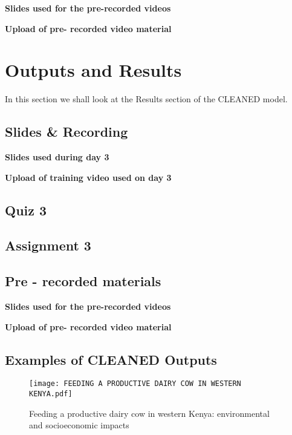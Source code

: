 \documentclass[
]{book}
\begin{document}
\textbf{Slides used for the pre-recorded videos}

\textbf{Upload of pre- recorded video material}

\hypertarget{outputs-and-results}{%
\chapter{Outputs and Results}\label{outputs-and-results}}

In this section we shall look at the Results section of the CLEANED model.

\hypertarget{slides-recording}{%
\section{Slides \& Recording}\label{slides-recording}}

\textbf{Slides used during day 3}

\textbf{Upload of training video used on day 3}

\hypertarget{quiz-3}{%
\section{Quiz 3}\label{quiz-3}}

\hypertarget{assignment-3}{%
\section{Assignment 3}\label{assignment-3}}

\hypertarget{pre---recorded-materials}{%
\section{Pre - recorded materials}\label{pre---recorded-materials}}

\textbf{Slides used for the pre-recorded videos}

\textbf{Upload of pre- recorded video material}

\hypertarget{examples-of-cleaned-outputs}{%
\section{Examples of CLEANED Outputs}\label{examples-of-cleaned-outputs}}

\begin{figure}
\centering
\texttt{[image: FEEDING A PRODUCTIVE DAIRY COW IN WESTERN KENYA.pdf]}
\caption{Feeding a productive dairy cow in western Kenya: environmental and socioeconomic impacts}
\end{figure}
\end{document}
